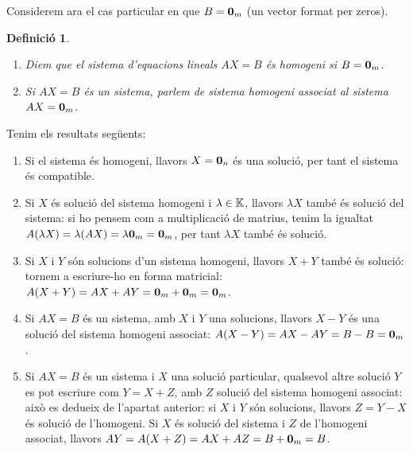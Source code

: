\documentclass[
  11pt,
]{book}
\numberwithin{dummy}{section}
\theoremstyle{maincolornumbox}
\theoremstyle{blacknumex}
\theoremstyle{blacknumbox}
\newtheorem{definitionT}{Definició}[chapter]
\theoremstyle{maincolornum}
\newenvironment{definition}{\begin{dBox}\begin{definitionT}}{\end{definitionT}\end{dBox}}
\begin{document}
Considerem ara el cas particular en que \(B=\mathbf{0}_m\) (un vector format per
zeros).

\begin{definition}
\leavevmode

\begin{enumerate}
\def\labelenumi{(\alph{enumi})}
\item
  Diem que el sistema d'equacions lineals \(AX=B\) \emph{és homogeni} si
  \(B=\mathbf{0}_m\).
\item
  Si \(AX=B\) és un sistema, parlem de \emph{sistema homogeni associat} al
  sistema \(AX=\mathbf{0}_m\).
\end{enumerate}

\end{definition}

Tenim els resultats següents:

\begin{enumerate}
\def\labelenumi{(\alph{enumi})}
\item
  Si el sistema és homogeni, llavors \(X=\mathbf{0}_n\) és una solució, per tant
  el sistema és compatible.
\item
  Si \(X\) és solució del sistema homogeni i \(\lambda\in\mathbb{K}\), llavors
  \(\lambda X\) també és solució del sistema: si ho pensem com a
  multiplicació de matrius, tenim la igualtat
  \(A(\lambda X)=\lambda (AX)=\lambda \mathbf{0}_m=\mathbf{0}_m\), per tant \(\lambda X\)
  també és solució.
\item
  Si \(X\) i \(Y\) són solucions d'un sistema homogeni, llavors \(X+Y\)
  també és solució: tornem a escriure-ho en forma matricial:
  \(A(X+Y)=AX+AY=\mathbf{0}_m+\mathbf{0}_m=\mathbf{0}_m\).
\item
  Si \(AX=B\) és un sistema, amb \(X\) i \(Y\) una solucions, llavors \(X-Y\)
  és una solució del sistema homogeni associat:
  \(A(X-Y)=AX-AY=B-B=\mathbf{0}_m\).
\item
  Si \(AX=B\) és un sistema i \(X\) una solució particular, qualsevol
  altre solució \(Y\) es pot escriure com \(Y=X+Z\), amb \(Z\) solució del
  sistema homogeni associat: això es dedueix de l'apartat anterior: si
  \(X\) i \(Y\) són solucions, llavors \(Z=Y-X\) és solució de l'homogeni.
  Si \(X\) és solució del sistema i \(Z\) de l'homogeni associat, llavors
  \(AY=A(X+Z)=AX+AZ=B+\mathbf{0}_m=B\).
\end{enumerate}
\end{document}

